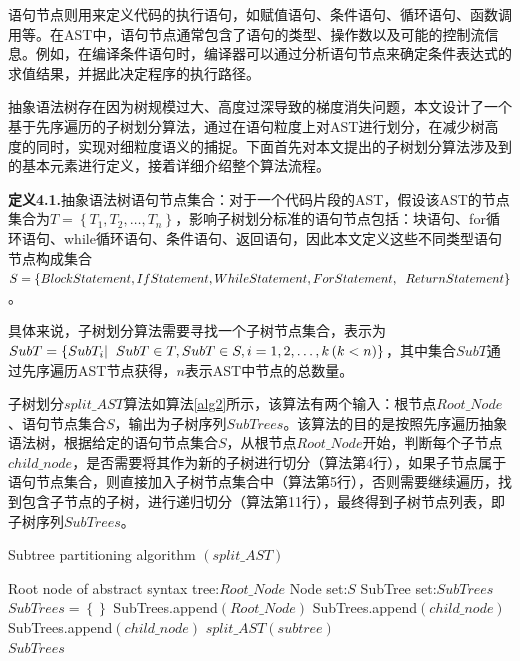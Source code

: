 语句节点则用来定义代码的执行语句，如赋值语句、条件语句、循环语句、函数调用等。在AST中，语句节点通常包含了语句的类型、操作数以及可能的控制流信息。例如，在编译条件语句时，编译器可以通过分析语句节点来确定条件表达式的求值结果，并据此决定程序的执行路径\cite{9534099}。

抽象语法树存在因为树规模过大、高度过深导致的梯度消失问题，本文设计了一个基于先序遍历的子树划分算法，通过在语句粒度上对AST进行划分，在减少树高度的同时，实现对细粒度语义的捕捉。下面首先对本文提出的子树划分算法涉及到的基本元素进行定义，接着详细介绍整个算法流程。

\textbf{定义4.1.}抽象语法树语句节点集合：对于一个代码片段的AST，假设该AST的节点集合为$T = \left\{T_1,T_2,\ldots,T_n\right\}$，影响子树划分标准的语句节点包括：块语句、for循环语句、while循环语句、条件语句、返回语句，因此本文定义这些不同类型语句节点构成集合$S = \left\{BlockStatement,IfStatement,WhileStatement,ForStatement,\notag \right.\\\left.ReturnStatement\right\}$。

具体来说，子树划分算法需要寻找一个子树节点集合，表示为$SubT = \left\{SubT_i |\notag \right.\\\left. SubT \in T, SubT \in S,i=1,2,\ldots,k\left(k<n\right)\right\}$，其中集合$SubT$通过先序遍历AST节点获得，$n$表示AST中节点的总数量。

子树划分$split\_AST$算法如算法\ref{alg2}所示，该算法有两个输入：根节点$Root\_Node$、语句节点集合$S$，输出为子树序列$SubTrees$。该算法的目的是按照先序遍历抽象语法树，根据给定的语句节点集合$S$，从根节点$Root\_Node$开始，判断每个子节点$child\_node$，是否需要将其作为新的子树进行切分（算法第4行），如果子节点属于语句节点集合，则直接加入子树节点集合中（算法第5行），否则需要继续遍历，找到包含子节点的子树，进行递归切分（算法第11行），最终得到子树节点列表，即子树序列$SubTrees$。

\begin{algorithm}[ht]  
	\renewcommand{\algorithmicrequire}{\textbf{Input:}}
	\renewcommand{\algorithmicensure}{\textbf{Output:}}
	\caption{Subtree partitioning algorithm $\left(split\_AST\right)$}  
	\label{alg2}
	\begin{algorithmic}[1]
    \Require Root node of abstract syntax tree:$Root\_Node$
    \Require Node set:$S$
		\Ensure SubTree set:$SubTrees$
    \State $SubTrees = \left\{\right\} $    
    \State SubTrees.append$\left(Root\_Node\right)$
       
        \State SubTrees.append$\left(child\_node\right)$
      \Else
         
            \State SubTrees.append$\left(child\_node\right)$
          \Else
            \State $ split\_AST\left(subtree\right)$ 
          \EndIf
        \EndFor
      \EndIf
    \EndFor \\
    \Return $SubTrees$
	\end{algorithmic}
\end{algorithm}


